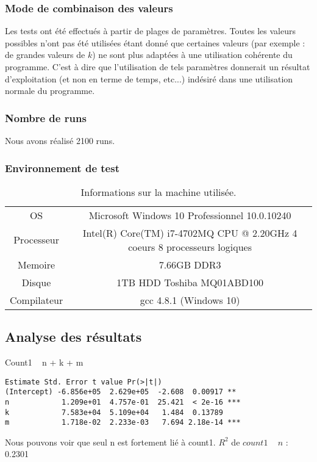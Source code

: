 \subsubsection{Mode de combinaison des valeurs}
Les tests ont été effectués à partir de plages de paramètres. Toutes les valeurs possibles n'ont pas été utilisées étant donné que certaines valeurs (par exemple : de grandes valeurs de $k$) ne sont plus adaptées à une utilisation cohérente du programme. C'est à dire que l'utilisation de tels paramètres donnerait un résultat d'exploitation (et non en terme de temps, etc...) indésiré dans une utilisation normale du programme.

\subsubsection{Nombre de runs}
Nous avons réalisé 2100 runs.

\subsubsection{Environnement de test}
\begin{table}[h!]
	\centering
	\caption{Informations sur la machine utilisée.}
	\label{tab:environnementExperience}
	\begin{tabular}{c|c}
		\toprule
		OS & Microsoft Windows 10 Professionnel 10.0.10240\\
		Processeur & Intel(R) Core(TM) i7-4702MQ CPU @ 2.20GHz 4 coeurs 8 processeurs logiques\\
		Memoire & 7.66GB DDR3\\
		Disque & 1TB HDD Toshiba MQ01ABD100\\
		Compilateur & gcc 4.8.1 (Windows 10)\\
		\bottomrule
	\end{tabular}
\end{table}


\subsection{Analyse des résultats}


Count1 ~ n + k + m
\begin{verbatim}
Estimate Std. Error t value Pr(>|t|)    
(Intercept) -6.856e+05  2.629e+05  -2.608  0.00917 ** 
n            1.209e+01  4.757e-01  25.421  < 2e-16 ***
k            7.583e+04  5.109e+04   1.484  0.13789    
m            1.718e-02  2.233e-03   7.694 2.18e-14 ***
\end{verbatim}
Nous pouvons voir que seul n est fortement lié à count1.
$R^2$ de $count1$ ~ $n$ : 0.2301

